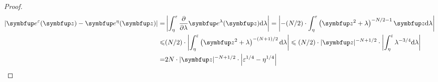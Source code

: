 \begin{proof}
    \begin{equation}
        \begin{aligned}
            \left|\vect{e}^{\varepsilon}(\vect{z})-\vect{e}^{\eta}(\vect{z})\right|=&\left|\int_{\eta}^{\varepsilon} \frac{\partial}{\partial \lambda} \vect{e}^{\lambda}(\vect{z}) \mathrm{d} \lambda\right|=\left|-(N / 2) \cdot \int_{\eta}^{\varepsilon}\left(\vect{z}^{2}+\lambda\right)^{-N / 2-1} \vect{z} \mathrm{d} \lambda\right|\\
            \leqslant &(N / 2) \cdot\left|\int_{\eta}^{\varepsilon}\left(\vect{z}^{2}+\lambda\right)^{-(N+1) / 2} \mathrm{d} \lambda\right| \leqslant(N / 2) \cdot|\vect{z}|^{-N+1 / 2} \cdot\left|\int_{\eta}^{\varepsilon} \lambda^{-3 / 4} \mathrm{d} \lambda\right|\\
            = & 2N \cdot|\vect{z}|^{-N+1 / 2} \cdot\left|\varepsilon^{1 / 4}-\eta^{1 / 4}\right|
        \end{aligned}
    \end{equation}
\end{proof}


